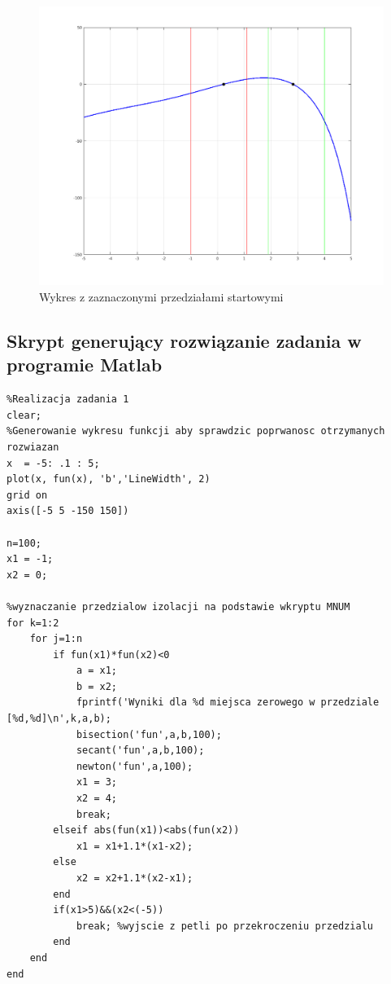 \documentclass[a4paper, 11pt]{article}
\begin{document}
\begin{figure}[H]
\caption{Wykres z zaznaczonymi przedziałami startowymi}
\includegraphics[width=\textwidth]{1}
\end{figure}


\subsection{Skrypt generujący rozwiązanie zadania w programie Matlab}
\begin{lstlisting}
%Realizacja zadania 1
clear; 
%Generowanie wykresu funkcji aby sprawdzic poprwanosc otrzymanych rozwiazan 
x  = -5: .1 : 5;
plot(x, fun(x), 'b','LineWidth', 2)
grid on
axis([-5 5 -150 150])

n=100; 
x1 = -1; 
x2 = 0; 

%wyznaczanie przedzialow izolacji na podstawie wkryptu MNUM
for k=1:2
    for j=1:n
        if fun(x1)*fun(x2)<0
            a = x1;
            b = x2;
            fprintf('Wyniki dla %d miejsca zerowego w przedziale [%d,%d]\n',k,a,b);
            bisection('fun',a,b,100);
            secant('fun',a,b,100);
            newton('fun',a,100);
            x1 = 3; 
            x2 = 4; 
            break;
        elseif abs(fun(x1))<abs(fun(x2))
            x1 = x1+1.1*(x1-x2);
        else
            x2 = x2+1.1*(x2-x1);
        end
        if(x1>5)&&(x2<(-5))
            break; %wyjscie z petli po przekroczeniu przedzialu
        end
    end
end
\end{lstlisting}
\vspace{1cm}
\end{document}
